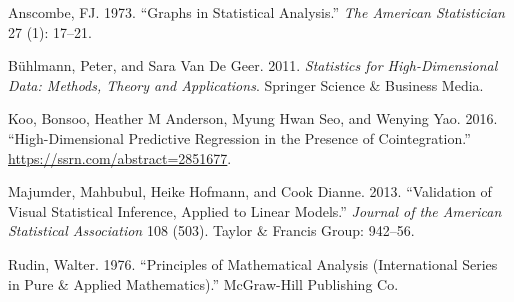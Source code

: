 \documentclass[12pt,]{article}
\begin{document}
\hypertarget{refs}{}
\hypertarget{ref-ANS73}{}
Anscombe, FJ. 1973. ``Graphs in Statistical Analysis.'' \emph{The
American Statistician} 27 (1): 17--21.

\hypertarget{ref-buhlmann}{}
Bühlmann, Peter, and Sara Van De Geer. 2011. \emph{Statistics for
High-Dimensional Data: Methods, Theory and Applications}. Springer
Science \& Business Media.

\hypertarget{ref-koo}{}
Koo, Bonsoo, Heather M Anderson, Myung Hwan Seo, and Wenying Yao. 2016.
``High-Dimensional Predictive Regression in the Presence of
Cointegration.'' \url{https://ssrn.com/abstract=2851677}.

\hypertarget{ref-MM13}{}
Majumder, Mahbubul, Heike Hofmann, and Cook Dianne. 2013. ``Validation
of Visual Statistical Inference, Applied to Linear Models.''
\emph{Journal of the American Statistical Association} 108 (503). Taylor
\& Francis Group: 942--56.

\hypertarget{ref-rudin}{}
Rudin, Walter. 1976. ``Principles of Mathematical Analysis
(International Series in Pure \& Applied Mathematics).'' McGraw-Hill
Publishing Co.
\end{document}

